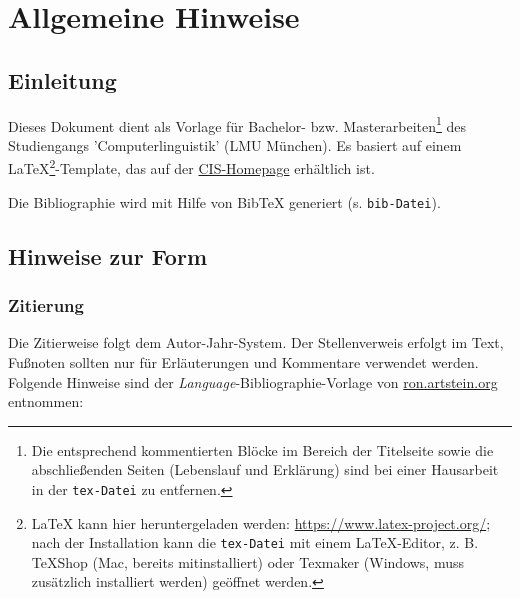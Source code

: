 \documentclass[11pt,a4paper,twoside,openright]{scrbook}
\begin{document}
\deckblatt
\pagestyle{scrheadings}

\tableofcontents

\clearpage
{}


\chapter{Allgemeine Hinweise}

\section{Einleitung}
Dieses Dokument dient als Vorlage für Bachelor- bzw. Masterarbeiten\footnote{Die entsprechend kommentierten Blöcke im Bereich der Titelseite sowie die abschließenden Seiten (Lebenslauf und Erklärung) sind bei einer Hausarbeit in der \texttt{tex-Datei} zu entfernen.} des Studiengangs 'Computerlinguistik' (LMU München). Es basiert auf einem LaTeX\footnote{LaTeX kann hier heruntergeladen werden: \url{https://www.latex-project.org/}; nach der Installation kann die \texttt{tex-Datei} mit einem LaTeX-Editor, z. B. TeXShop (Mac, bereits mitinstalliert) oder Texmaker (Windows, muss zusätzlich installiert werden) geöffnet werden.}-Template, das auf der \href{https://www.cis.lmu.de/}{CIS-Homepage} erhältlich ist.

Die Bibliographie wird mit Hilfe von BibTeX generiert (s. \verb+bib-Datei+).


\section{Hinweise zur Form}

\subsection{Zitierung} 
\label{sec:cit}

Die Zitierweise folgt dem Autor-Jahr-System. Der Stellenverweis erfolgt im Text, Fußnoten sollten nur für Erläuterungen und Kommentare verwendet werden. Folgende Hinweise sind der \emph{Language}-Bibliographie-Vorlage von \url{ron.artstein.org} entnommen:\newline
\end{document}
